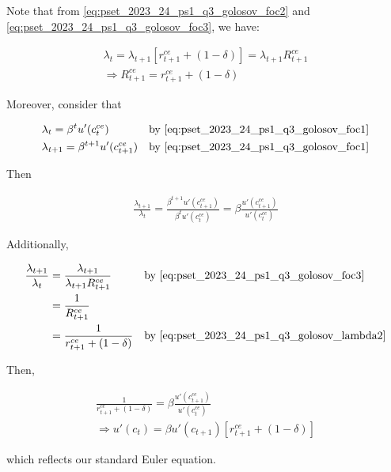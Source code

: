 Note that from \eqref{eq:pset_2023_24_ps1_q3_golosov_foc2} and \eqref{eq:pset_2023_24_ps1_q3_golosov_foc3}, we have:

\begin{align}
    \lambda_t = \lambda_{t+1}\left[r_{t+1}^{ce} + (1 - \delta)\right] = \lambda_{t+1}R_{t+1}^{ce} \label{eq:pset_2023_24_ps1_q3_golosov_lambda} \\
    \Rightarrow R_{t+1}^{ce} = r_{t+1}^{ce} + (1 - \delta) \label{eq:pset_2023_24_ps1_q3_golosov_lambda2}
\end{align}


Moreover, consider that 

\begin{align}
    &\lambda_t = \beta^t u'(c_t^{ce}) && \text{by \eqref{eq:pset_2023_24_ps1_q3_golosov_foc1}} \\
    &\lambda_{t+1} = \beta^{t+1} u'(c_{t+1}^{ce}) && \text{by \eqref{eq:pset_2023_24_ps1_q3_golosov_foc1}} \\
\end{align}

Then

\begin{align}
    \frac{\lambda_{t+1}}{\lambda_t} = \frac{\beta^{t+1} u'(c_{t+1}^{ce})}{\beta^t u'(c_t^{ce})} = \beta \frac{u'(c_{t+1}^{ce})}{u'(c_t^{ce})} \label{eq:pset_2023_24_ps1_q3_golosov_lambda_ratio}
\end{align}

Additionally,

\begin{align}
    \frac{\lambda_{t+1}}{\lambda_t}&= \frac{\lambda_{t+1}}{\lambda_{t+1}R_{t+1}^{ce}} && \text{by \eqref{eq:pset_2023_24_ps1_q3_golosov_foc3}} \\
    &= \frac{1}{R_{t+1}^{ce}} \\
    &= \frac{1}{r_{t+1}^{ce} + (1 - \delta)} && \text{by \eqref{eq:pset_2023_24_ps1_q3_golosov_lambda2}} \\
\end{align}

Then,

\begin{align}
    \frac{1}{r_{t+1}^{ce} + (1 - \delta)} = \beta \frac{u'(c_{t+1}^{ce})}{u'(c_t^{ce})} \\
    \Rightarrow u'(c_t) = \beta u'(c_{t+1})[r_{t+1}^{ce} + (1 - \delta)] \label{eq:pset_2023_24_ps1_q3_golosov_euler}
\end{align}

which reflects our standard Euler equation.

